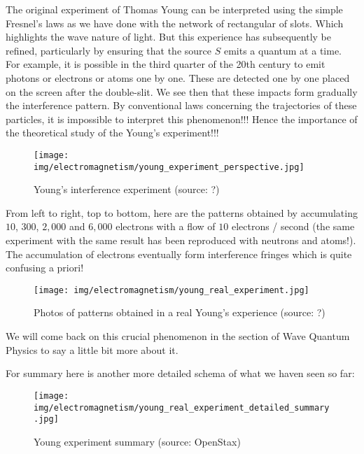 	The original experiment of Thomas Young can be interpreted using the simple Fresnel's laws as we have done with the network of rectangular of slots. Which highlights the wave nature of light. But this experience has subsequently be refined, particularly by ensuring that the source $S$ emits a quantum at a time. For example, it is possible in the third quarter of the 20th century to emit photons or electrons or atoms one by one. These are detected one by one placed on the screen after the double-slit. We see then that these impacts form gradually the interference pattern. By conventional laws concerning the trajectories of these particles, it is impossible to interpret this phenomenon!!! Hence the importance of the theoretical study of the Young's experiment!!!
	\begin{figure}[H]
		\centering
		\texttt{[image: img/electromagnetism/young\_experiment\_perspective.jpg]}
		\caption[Young's interference experiment]{Young's interference experiment (source: ?)}
	\end{figure}
	From left to right, top to bottom, here are the patterns obtained by accumulating $10$, $300$, $2,000$ and $6,000$ electrons with a flow of $10$ electrons / second (the same experiment with the same result has been reproduced with neutrons and atoms!). The accumulation of electrons eventually form interference fringes which is quite confusing a priori!
	\begin{figure}[H]
		\centering
		\texttt{[image: img/electromagnetism/young\_real\_experiment.jpg]}
		\caption[Photos of patterns obtained in a real Young's experience]{Photos of patterns obtained in a real Young's experience (source: ?)}
	\end{figure}
	We will come back on this crucial phenomenon in the section of Wave Quantum Physics to say a little bit more about it.
	
	For summary here is another more detailed schema of what we haven seen so far:
	\begin{figure}[H]
		\centering
		\texttt{[image: img/electromagnetism/young\_real\_experiment\_detailed\_summary.jpg]}	
		\caption[Young experiment summary]{Young experiment summary (source: OpenStax)}
	\end{figure}
		
	\pagebreak	
